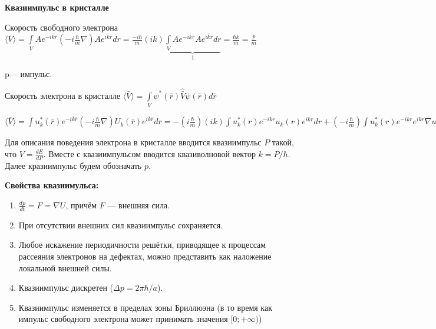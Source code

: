 

\textbf{Квазиимпульс в кристалле}


    

Скорость свободного электрона $ \displaystyle \langle\bar{V}\rangle=\int \limits_V A e^{-i \bar{k} \bar{r}}\left(-i \frac{\hbar}{m} \nabla\right) A e^{i \bar{k} \bar{r}} d r =  \frac{-i\hbar}{m}(i k) \underbrace{\int\limits _V A e^{-i \bar{k} \bar{r}} A e^{i \bar{k} \bar{r}} d r}_1 =\frac{\hbar k}{m}=\frac{p}{m}$

p--- импульс.


Скорость электрона в кристалле $\langle \bar{V} \rangle=\int \limits_V \psi^*(\bar{r}) \hat{\bar{V}} \psi(\bar{r}) d \bar{r}$

$\displaystyle \langle\bar{V}\rangle=\int u_k^*(\bar{r}) e^{-i \bar{k} \bar{r}}\left(-i \frac{\hbar}{m} \nabla\right) U_k(\bar{r}) e^{i \bar{k} \bar{r}} d r=  -\left(i \frac{\hbar}{m}\right)(i k) \int u_k^*(r) e^{-i k r} u_k(r) e^{i k r} d r+  \left(-i \frac{\hbar}{m}\right) \int u_k^*(r) e^{-i k r} e^{i k r} \nabla u_k(r) d r= \frac{\hbar k}{m}-i \frac{\hbar}{m} \int u_k^*(r) \nabla u_k(r) d r \neq \frac{p}{m}$

\bigskip

Для описания поведения электрона в кристалле вводится квазиимпульс $P$ такой, что $\displaystyle V=\frac{dE}{dP}$. Вместе с квазиимпульсом вводится квазиволновой вектор $k=P/\hbar$. Далее кразиимпульс будем обозначать $p$.

\textbf{Свойства квазиимульса:}
\begin{enumerate}
    \item $\displaystyle \frac{dp}{dt}=F=\nabla U$, причём $F$ --- внешняя сила.
    \item При отсутствии внешних сил квазиимпульс сохраняется.
    \item Любое искажение периодичности решётки, приводящее к процессам рассеяния электронов на дефектах, можно представить как наложение локальной внешней силы.
    \item Квазиимпульс дискретен ($\Delta p = 2\pi \hbar /a$).
    \item Квазиимпульс изменяется в пределах зоны Бриллюэна (в то время как импульс свободного электрона может принимать значения $[0; +\infty)$)
\end{enumerate}


